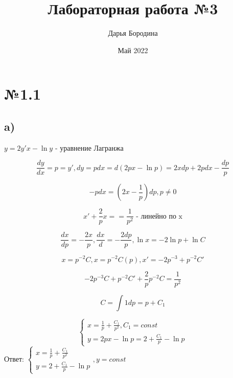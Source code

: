 \documentclass{article}
\title{Лабораторная работа №3}
\author{Дарья Бородина}
\date{Май 2022}
\begin{document}
\maketitle

\section*{№1.1}
\subsection*{a)}
$y = 2y'x - \ln{y}$ - уравнение Лагранжа

\begin{equation*}
    \frac{dy}{dx} = p = y', dy = pdx = d (2px - \ln{p}) = 2xdp + 2pdx - \frac{dp}{p}
\end{equation*}

\begin{equation*}
    -pdx = (2x - \frac{1}{p})dp , p \ne 0
\end{equation*}

\begin{equation*}
    x' + \frac{2}{p}x = = \frac{1}{p^2} \text{ - линейно по x}
\end{equation*}

\begin{equation*}
    \frac{dx}{dp} = -\frac{2x}{p}, \frac{dx}{d} = - \frac{2dp}{p}, \ln{x} = -2\ln{p} + \ln{C}
\end{equation*}

\begin{equation*}
    x = p^{-2}C, x = p^{-2}C(p), x' = -2p^{-3} + p^{-2}C'
\end{equation*}

\begin{equation*}
    -2p^{-3}C + p^{-2}C' + \frac{2}{p}p^{-2}C = \frac{1}{p^2}
\end{equation*}

\begin{equation*}
    C = \int{1dp} = p + C_1
\end{equation*}

\begin{equation*}
    \begin{cases}
    x = \frac{1}{p} +\frac{C_1}{p^2}, C_1 = const\\
    y = 2px - \ln{p} = 2 + \frac{C_1}{p} - \ln{p}
    \end{cases}
\end{equation*}
Ответ:
$
    \begin{cases}
     x = \frac{1}{p} +\frac{C_1}{p^2}\\
    y = 2 + \frac{C_1}{p} - \ln{p}
    \end{cases}, y = const
$
\end{document}
